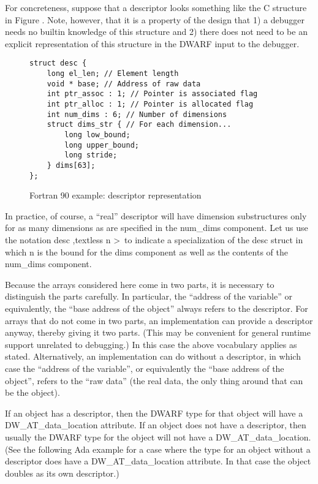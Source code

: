 For concreteness, suppose that a descriptor looks something
like the C structure in 
Figure .
Note, however, that it is
a property of the design that 1) a debugger needs no builtin
knowledge of this structure and 2) there does not need to
be an explicit representation of this structure in the DWARF
input to the debugger.

\begin{figure}[here]
\begin{lstlisting}
struct desc {
    long el_len; // Element length
    void * base; // Address of raw data
    int ptr_assoc : 1; // Pointer is associated flag
    int ptr_alloc : 1; // Pointer is allocated flag
    int num_dims : 6; // Number of dimensions
    struct dims_str { // For each dimension...  
        long low_bound;
        long upper_bound;
        long stride;
    } dims[63];
};
\end{lstlisting}
\caption{Fortran 90 example: descriptor representation} \label{fig:fortran90exampledescriptorrepresentation}
\end{figure}


In practice, of course, a “real” descriptor will have
dimension substructures only for as many dimensions as are
specified in the num\_dims component. Let us use the notation
desc ,textless n \textgreater\   
to indicate a specialization of the desc struct in
which n is the bound for the dims component as well as the
contents of the num\_dims component.

Because the arrays considered here come in two parts, it is
necessary to distinguish the parts carefully. In particular,
the “address of the variable” or equivalently, the “base
address of the object” always refers to the descriptor. For
arrays that do not come in two parts, an implementation can
provide a descriptor anyway, thereby giving it two parts. (This
may be convenient for general runtime support unrelated to
debugging.) In this case the above vocabulary applies as
stated. Alternatively, an implementation can do without a
descriptor, in which case the “address of the variable”,
or equivalently the “base address of the object”, refers
to the “raw data” (the real data, the only thing around
that can be the object).

If an object has a descriptor, then the DWARF type for that
object will have a DW\-\_AT\-\_data\-\_location attribute. If an object
does not have a descriptor, then usually the DWARF type for the
object will not have a DW\-\_AT\-\_data\-\_location. (See the following
Ada example for a case where the type for an object without
a descriptor does have a DW\-\_AT\-\_data\-\_location attribute. In
that case the object doubles as its own descriptor.)

